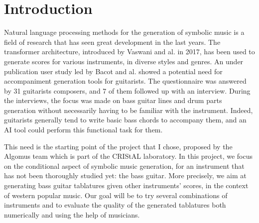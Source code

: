 \documentclass[11pt, a4paper]{article}
\begin{document}






\newpage

\section*{Introduction}

Natural language processing methods for the generation of symbolic music is a field of research that has seen great development in the last years.
The transformer architecture, introduced by Vaswani and al. in 2017, has been used to generate scores for various instruments, in diverse styles and genres\cite{vaswaniAttentionAllYou2023, leNaturalLanguageProcessing2024}.
An under publication user study led by Bacot and al. showed a potential need for accompaniment generation tools for guitarists.
The questionnaire was answered by 31 guitarists composers, and 7 of them followed up with an interview.
During the interviews, the focus was made on bass guitar lines and drum parts generation without necessarily having to be familiar with the instrument.
Indeed, guitarists generally tend to write basic bass chords to accompany them, and an AI tool could perform this functional task for them\cite{bacot_tablature_2025}.


This need is the starting point of the project that I chose, proposed by the Algomus team which is part of the CRIStAL laboratory.
In this project, we focus on the conditional aspect of symbolic music generation, for an instrument that has not been thoroughly studied yet: the bass guitar.
More precisely, we aim at generating bass guitar tablatures given other instruments' scores, in the context of western popular music.
Our goal will be to try several combinations of instruments and to evaluate the quality of the generated tablatures both numerically and using the help of musicians.
\end{document}
